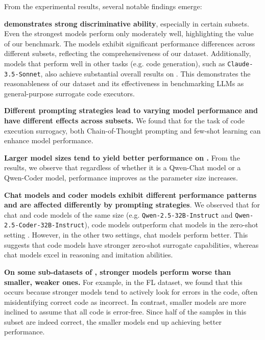 From the experimental results, several notable findings emerge:

\textbf{\bench demonstrates strong discriminative ability}, especially in certain subsets. Even the strongest models perform only moderately well, highlighting the value of our benchmark. The models exhibit significant performance differences across different subsets, reflecting the comprehensiveness of our dataset. Additionally, models that perform well in other tasks (e.g. code generation), such as \texttt{Claude-3.5-Sonnet}, also achieve substantial overall results on \bench. This demonstrates the reasonableness of our dataset and its effectiveness in benchmarking LLMs as general-purpose surrogate code executors.

\textbf{Different prompting strategies lead to varying model performance and have different effects across subsets.} We found that for the task of code execution surrogacy, both Chain-of-Thought prompting and few-shot learning can enhance model performance.

\textbf{Larger model sizes tend to yield better performance on \bench.} From the results, we observe that regardless of whether it is a Qwen-Chat model or a Qwen-Coder model, performance improves as the parameter size increases.

\textbf{Chat models and coder models exhibit different performance patterns and are affected differently by prompting strategies}. We observed that for chat and code models of the same size (e.g. \texttt{Qwen-2.5-32B-Instruct} and \texttt{Qwen-2.5-Coder-32B-Instruct}), code models outperform chat models in the zero-shot setting \bench. However, in the other two settings, chat models perform better. This suggests that code models have stronger zero-shot surrogate capabilities, whereas chat models excel in reasoning and imitation abilities.

\textbf{On some sub-datasets of \bench, stronger models perform worse than smaller, weaker ones.} For example, in the FL dataset, we found that this occurs because stronger models tend to actively look for errors in the code, often misidentifying correct code as incorrect. In contrast, smaller models are more inclined to assume that all code is error-free. Since half of the samples in this subset are indeed correct, the smaller models end up achieving better performance.

